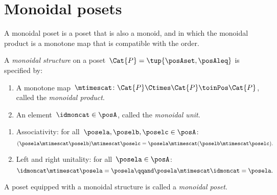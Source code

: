 
\section{Monoidal posets}
\label{sec:monoidal-posets}

A monoidal poset is a poset that is also a monoid, and in which the monoidal product is a monotone map that is compatible with the order.


\begin{ctdefinition}
    \label{def:monoidal-poset}
    A \emph{monoidal structure} on a poset~$\Cat{P} = \tup{\posAset, \posAleq}$ is specified by:

    \constit
    \begin{enumerate}
        \item A monotone map~$\mtimescat \colon \Cat{P} \Ctimes \Cat{P} \toinPos \Cat{P}$, called the \emph{monoidal product}.
        \item An element~$\idmoncat \in \posA$, called the \emph{monoidal unit}.
    \end{enumerate}

    \condit
    \begin{enumerate}
        \item Associativity: for all~$\posela, \poselb, \poselc \in \posA$:
              \begin{equation}
                  (\posela \mtimescat \poselb)
                  \mtimescat \poselc =  \posela  \mtimescat ( \poselb \mtimescat \poselc).
              \end{equation}
        \item Left and right unitality: for all~$\posela \in \posA$:
              \begin{equation}
                  \idmoncat \mtimescat \posela = \posela
                  \qqand
                  \posela \mtimescat \idmoncat = \posela.
              \end{equation}
    \end{enumerate}

    \noindent A poset equipped with a monoidal structure is called a \emph{monoidal poset}.
\end{ctdefinition}


